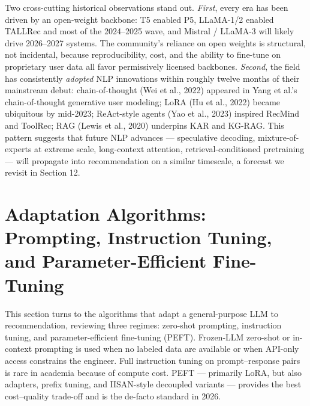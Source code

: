 Two cross-cutting historical observations stand out. \emph{First}, every era has been driven by an open-weight backbone: T5 enabled P5, LLaMA-1/2 enabled TALLRec and most of the 2024--2025 wave, and Mistral / LLaMA-3 will likely drive 2026--2027 systems. The community's reliance on open weights is structural, not incidental, because reproducibility, cost, and the ability to fine-tune on proprietary user data all favor permissively licensed backbones. \emph{Second}, the field has consistently \emph{adopted} NLP innovations within roughly twelve months of their mainstream debut: chain-of-thought (Wei et al., 2022) appeared in Yang et al.'s chain-of-thought generative user modeling; LoRA (Hu et al., 2022) became ubiquitous by mid-2023; ReAct-style agents (Yao et al., 2023) inspired RecMind and ToolRec; RAG (Lewis et al., 2020) underpins KAR and KG-RAG. This pattern suggests that future NLP advances --- speculative decoding, mixture-of-experts at extreme scale, long-context attention, retrieval-conditioned pretraining --- will propagate into recommendation on a similar timescale, a forecast we revisit in Section 12.

\section{Adaptation Algorithms: Prompting, Instruction Tuning, and Parameter-Efficient Fine-Tuning}\label{adaptation-algorithms-prompting-instruction-tuning-and-parameter-efficient-fine-tuning}

This section turns to the algorithms that adapt a general-purpose LLM to recommendation, reviewing three regimes: zero-shot prompting, instruction tuning, and parameter-efficient fine-tuning (PEFT). Frozen-LLM zero-shot or in-context prompting is used when no labeled data are available or when API-only access constrains the engineer. Full instruction tuning on prompt--response pairs is rare in academia because of compute cost. PEFT --- primarily LoRA, but also adapters, prefix tuning, and IISAN-style decoupled variants --- provides the best cost--quality trade-off and is the de-facto standard in 2026.

